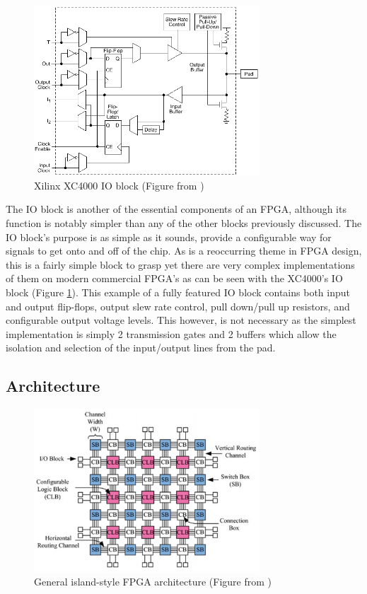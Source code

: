 \documentclass[12pt]{article}
\begin{document}
\begin{figure}[ht]
    \centering
    \includegraphics[width=0.75\textwidth]{complex_io}
    \caption{Xilinx XC4000 IO block (Figure from \cite{xilinx_xc4000})}
    \label{fig:complex_io}
\end{figure}

The IO block is another of the essential components of an FPGA, although its function
is notably simpler than any of the other blocks previously discussed. The IO block's
purpose is as simple as it sounds, provide a configurable way for signals to get onto and off of
the chip. As is a reoccurring theme in FPGA design, this is a fairly simple block to
grasp yet there are very complex implementations of them on modern commercial FPGA's
as can be seen with the XC4000's IO block (Figure \ref{fig:complex_io}). This example of
a fully featured IO block contains both input and output flip-flops, output slew rate
control, pull down/pull up resistors, and configurable output voltage levels. This
however, is not necessary as the simplest implementation is simply 2 transmission gates
and 2 buffers which allow the isolation and selection of the input/output lines from
the pad.

\subsection{Architecture} \label{Architecture}

\begin{figure}[ht]
    \centering
    \includegraphics[width=0.75\textwidth]{generalarch}
    \caption{General island-style FPGA architecture (Figure from \cite{fpga_arch_overview})}
    \label{fig:island_style}
\end{figure}
\end{document}

